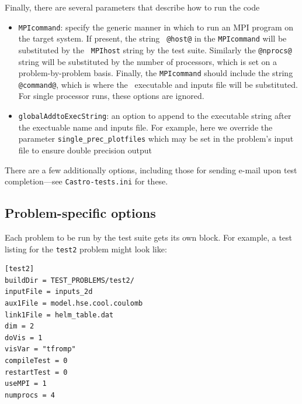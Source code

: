 Finally, there are several parameters that describe how to run the code
\begin{itemize}
\item {\tt MPIcommand}: specify the generic manner in which to run an
  MPI program on the target system.  If present, the string {\tt
    @host@} in the {\tt MPIcommand} will be substituted by the {\tt
    MPIhost} string by the test suite.  Similarly the {\tt @nprocs@}
  string will be substituted by the number of processors, which is set
  on a problem-by-problem basis.  Finally, the {\tt MPIcommand} should
  include the string {\tt @command@}, which is where the
  \maestro\ executable and inputs file will be substituted.  For
  single processor runs, these options are ignored.
\item {\tt globalAddtoExecString}: an option to append to the
  executable string after the exectuable name and inputs file.  For
  example, here we override the parameter {\tt single\_prec\_plotfiles}
  which may be set in the problem's input file to ensure double
  precision output
\end{itemize}

There are a few additionally options, including those for sending
e-mail upon test completion---see {\tt Castro-tests.ini} for these.


\subsection{Problem-specific options}

Each problem to be run by the test suite gets its own block.  For
example, a test listing for the {\tt test2} problem might look like:

\begin{lstlisting}
[test2]
buildDir = TEST_PROBLEMS/test2/
inputFile = inputs_2d
aux1File = model.hse.cool.coulomb
link1File = helm_table.dat
dim = 2
doVis = 1
visVar = "tfromp"
compileTest = 0 
restartTest = 0
useMPI = 1
numprocs = 4
\end{lstlisting}

